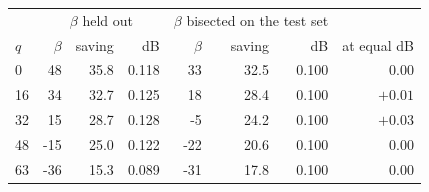 \begin{tabular}{lrrrrrrr}
\toprule
 & \multicolumn{3}{c}{$\beta$ held out} & \multicolumn{3}{c}{$\beta$ bisected on the test set} & \\
$q$ & $\beta$ & saving & dB & $\beta$ & saving & dB & at equal dB \\
\midrule
0 & 48 & 35.8 & 0.118 & 33 & 32.5 & 0.100 & $0.00$ \\
16 & 34 & 32.7 & 0.125 & 18 & 28.4 & 0.100 & $+0.01$ \\
32 & 15 & 28.7 & 0.128 & -5 & 24.2 & 0.100 & $+0.03$ \\
48 & -15 & 25.0 & 0.122 & -22 & 20.6 & 0.100 & $0.00$ \\
63 & -36 & 15.3 & 0.089 & -31 & 17.8 & 0.100 & $0.00$ \\
\bottomrule
\end{tabular}
